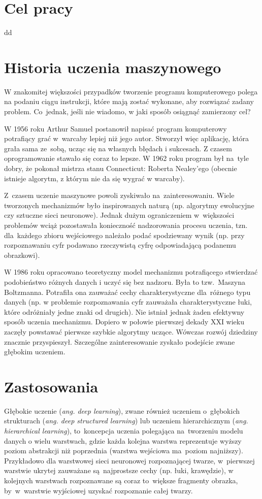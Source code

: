 \section{Cel pracy}
dd

\section{Historia uczenia maszynowego}
W znakomitej większości przypadków tworzenie programu komputerowego polega
na podaniu ciągu instrukcji, które mają zostać wykonane, aby rozwiązać zadany
problem. Co~jednak, jeśli nie wiadomo, w jaki sposób osiągnąć zamierzony cel?

W 1956 roku Arthur Samuel postanowił napisać program komputerowy
potrafiący grać w~warcaby lepiej niż jego autor. Stworzył więc aplikację,
która grała sama ze~sobą, ucząc się na własnych błędach i sukcesach.
Z czasem oprogramowanie stawało się coraz to lepsze. W 1962 roku program był
na~tyle dobry, że pokonał mistrza stanu Connecticut: Roberta Nealey'ego
(obecnie istnieje algorytm, z którym nie da się wygrać w warcaby).

Z~czasem uczenie maszynowe powoli zyskiwało na~zainteresowaniu.
Wiele tworzonych mechanizmów było inspirowanych naturą (np. algorytmy
ewolucyjne czy sztuczne sieci neuronowe). Jednak dużym ograniczeniem
w~większości problemów wciąż pozostawała konieczność nadzorowania procesu
uczenia, tzn. dla~każdego zbioru wejściowego należało podać spodziewany wynik
(np. przy rozpoznawaniu cyfr podawano rzeczywistą cyfrę odpowiadającą podanemu
obrazkowi).

W 1986 roku opracowano teoretyczny model mechanizmu potrafiącego stwierdzać
podobieństwo różnych danych i uczyć się bez nadzoru. Była to tzw.~Maszyna
Boltzmanna. Potrafiła ona zauważać cechy charakterystyczne dla~różnego typu
danych (np. w problemie rozpoznawania cyfr zauważała charakterystyczne łuki,
które odróżniały jedne znaki od drugich).
Nie istniał jednak żaden efektywny sposób uczenia mechanizmu.
Dopiero w połowie pierwszej dekady XXI wieku zaczęły powstawać pierwsze szybkie
algorytmy uczące. Wówczas rozwój dziedziny znacznie przyspieszył.
Szczególne zainteresowanie zyskało podejście zwane głębokim uczeniem.

\section{Zastosowania}
Głębokie uczenie (\textit{ang. deep learning}), zwane również uczeniem
o~głębokich strukturach (\textit{ang. deep structured learning}) lub uczeniem
hierarchicznym (\textit{ang. hierarchical learning}), to~koncepcja uczenia
polegająca na~tworzeniu modelu danych o wielu warstwach, gdzie każda kolejna
warstwa reprezentuje wyższy poziom abstrakcji niż poprzednia (warstwa wejściowa
ma~poziom najniższy). Przykładowo dla warstwowej sieci neuronowej rozpoznającej
twarze, w~pierwszej warstwie ukrytej zauważane są~najprostsze cechy (np. łuki,
krawędzie), w kolejnych warstwach rozpoznawane są coraz to~większe fragmenty
obrazka, by~w~warstwie wyjściowej uzyskać rozpoznanie całej twarzy.


